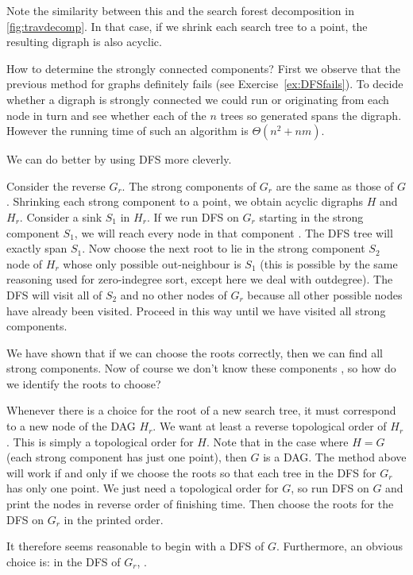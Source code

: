 Note the similarity between this and the search forest decomposition
in \cref{fig:travdecomp}. In that case, if we shrink each
search tree to a point, the resulting digraph is also acyclic.

How to determine the strongly connected components? First we observe
that the previous method for graphs definitely fails (see
Exercise~\ref{ex:DFSfails}). To decide whether a digraph is strongly
connected we could run  or 
originating from each node in turn and see whether each of the $n$ trees
so generated spans the digraph. However the running time of such an
algorithm is $\Theta(n^2+nm)$.

We can do better by using DFS more cleverly. 

Consider the reverse $G_r$. The strong components of $G_r$ are the
same as those of $G$. Shrinking each strong component to a point,
we obtain  acyclic digraphs $H$ and $H_r$. Consider a sink $S_1$ in
$H_r$. If we run DFS on $G_r$ starting  in the strong component
$S_1$, we will reach every node in that component . The DFS tree will exactly span $S_1$. Now
choose the next root to lie in the strong component $S_2$ node of
$H_r$ whose only possible out-neighbour is $S_1$ (this is possible
by the same reasoning used for zero-indegree sort, except here we
deal with outdegree). The DFS will visit all of $S_2$ and no other
nodes of $G_r$ because all other possible nodes have already been
visited. Proceed in this way until we have visited all strong
components.

We have shown that if we can choose the roots correctly, then we can
find all strong components. Now of course we don't know these components
, so how do we identify the roots to choose?

Whenever there is a choice for the root of a new search tree, it must
correspond to a new node of the DAG $H_r$. We want at least a reverse
topological order of $H_r$. This is simply a topological order for
$H$. Note that in the case where $H=G$ (each strong component has just
one point), then $G$ is a DAG. The method above will work if and only
if we choose the roots so that each tree in the DFS for $G_r$ has only
one point. We just need a topological order for $G$, so run DFS on $G$
and print the nodes in reverse order of finishing time. Then choose the
roots for the DFS on $G_r$ in the printed order.

It therefore seems reasonable to begin with a DFS of $G$. Furthermore,
an obvious choice is: in the DFS of $G_r$, .


